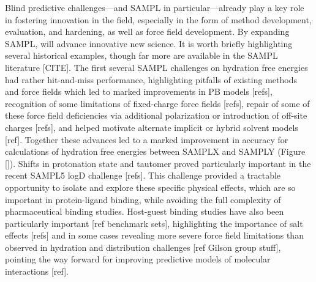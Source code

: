 \documentclass[11pt]{article}
\begin{document}
Blind predictive challenges---and SAMPL in particular---already play a key role in fostering innovation in the field, especially in the form of method development, evaluation, and hardening, as well as force field development. 
By expanding SAMPL, will advance innovative new science. 
It is worth briefly highlighting several historical examples, though far more are available in the SAMPL literature [CITE]. 
The first several SAMPL challenges on hydration free energies had rather hit-and-miss performance, highlighting pitfalls of existing methods and force fields which led to marked improvements in PB models [refs],
 recognition of some limitations of fixed-charge force fields [refs],
repair of some of these force field deficiencies via additional polarization or introduction of off-site charges [refs],
and helped motivate alternate implicit or hybrid solvent models [ref].
Together these advances led to a marked improvement in accuracy for calculations of hydration free energies between SAMPLX and SAMPLY (Figure []).
%
%
Shifts in protonation state and tautomer proved particularly important in the recent SAMPL5 logD challenge [refs].
This challenge provided a tractable opportunity to isolate and explore these specific physical effects, which are so important in protein-ligand binding, while avoiding the full complexity of pharmaceutical binding studies.
Host-guest binding studies have also been particularly important [ref benchmark sets],
highlighting the importance of salt effects [refs]
and in some cases revealing more severe force field limitations than observed in hydration and distribution challenges [ref Gilson group stuff],
pointing the way forward for improving predictive models of molecular interactions [ref].
\end{document}

